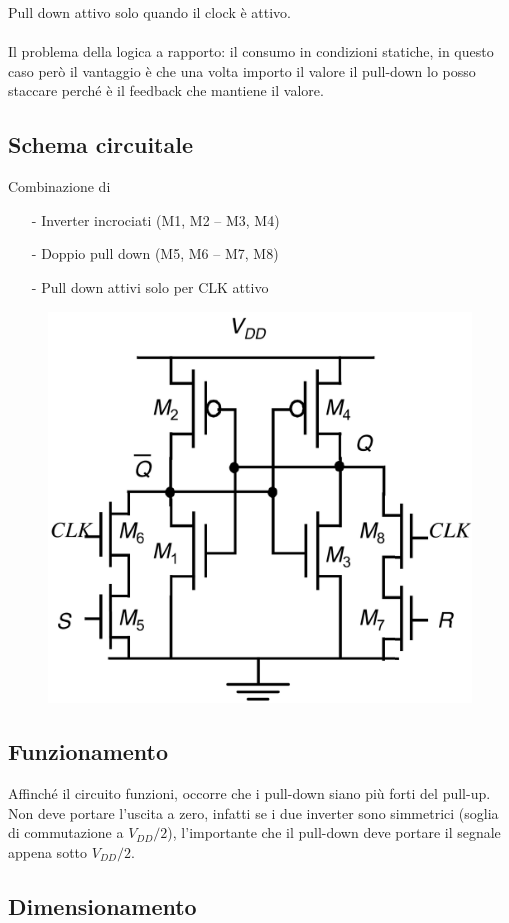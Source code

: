 Pull down attivo solo quando  il clock è attivo.

\paragraph{}
Il problema della logica a rapporto: il consumo in condizioni statiche, in questo caso però il vantaggio è che una volta importo il valore il pull-down lo posso staccare perché è il feedback che mantiene il valore.

\newpage
\subsection{Schema circuitale}

Combinazione di

\begin{itemize}
    \item[-] Inverter incrociati (M1, M2 – M3, M4)
    \item[-] Doppio pull down (M5, M6 – M7, M8)
    \item[-] Pull down attivi solo per CLK attivo
\end{itemize}


\begin{figure}[htbp]
    \centering
    \includegraphics[width=0.4\linewidth]{img/schema_circccc.png}
\end{figure}


\subsection{Funzionamento}

Affinché il circuito funzioni, occorre che i pull-down siano più forti del pull-up. Non deve portare l'uscita a zero, infatti se i due inverter sono simmetrici (soglia di commutazione a $V_{DD}/2$), l'importante che il pull-down deve portare il segnale appena sotto $V_{DD}/2$.

\subsection{Dimensionamento}

